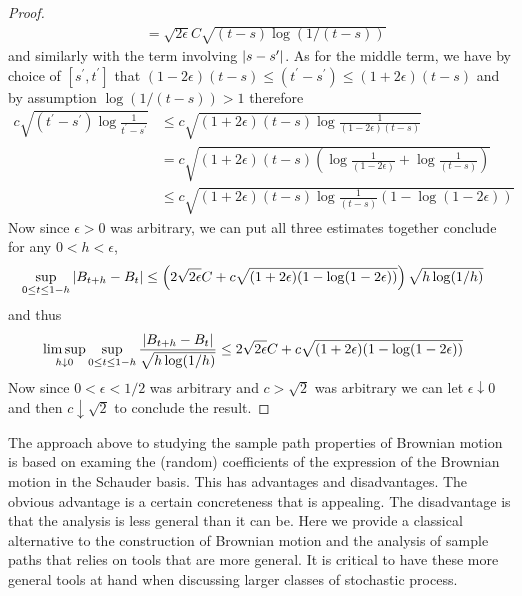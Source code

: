 \begin{proof}
\begin{align*}
&= \sqrt{2 \epsilon} C \sqrt{(t-s)\log(1/(t-s))}
\end{align*}
and similarly with the term involving $\left \vert s- s^\prime \right \vert$.  As for the
middle term, we have by choice of $[s^\prime, t^\prime]$ that $(1 -
2\epsilon)(t -s) \leq (t^\prime - s^\prime) \leq (1+2 \epsilon)(t-s)$
and by assumption $\log(1/(t-s)) > 1$ therefore
\begin{align*}
c \sqrt{(t^\prime - s^\prime)  \log\frac{1}{t^\prime -s^\prime}} &\leq c
\sqrt{(1 + 2\epsilon) (t - s)  \log\frac{1}{(1-2\epsilon) (t -s)}} \\
&= c\sqrt{(1 + 2\epsilon) (t - s)  (\log\frac{1}{(1-2\epsilon) }
+ \log\frac{1}{ (t -s)})} \\
&\leq c\sqrt{(1 + 2\epsilon) (t - s)  \log\frac{1}{ (t -s)} (1- \log(1-2\epsilon))} 
\end{align*}
Now since $\epsilon > 0$ was arbitrary, we can put all three estimates
together conclude for any $0 < h < \epsilon$, 
\begin{align*}
\sup_{0 \leq t \leq 1-h} \left \vert B_{t+h} - B_t \right \vert &\leq \left ( 2\sqrt{2\epsilon}C
  +  c\sqrt{(1 + 2\epsilon) (1- \log(1-2\epsilon)) } \right) \sqrt{h\log(1/h)}
\end{align*}
and thus 
\begin{align*}
\limsup_{h \downarrow 0} \sup_{0 \leq t \leq 1-h} \frac{\left \vert B_{t+h} - B_t \right \vert}{\sqrt{h\log(1/h)}} &\leq  2\sqrt{2\epsilon}C
  +  c\sqrt{(1 + 2\epsilon) (1- \log(1-2\epsilon))} 
\end{align*}
Now since $0 < \epsilon < 1/2$ was arbitrary and $c > \sqrt{2}$ was
arbitrary we can let $\epsilon \downarrow 0$ and then $c \downarrow
\sqrt{2}$ to conclude the result.
\end{proof}

The approach above to studying the sample path properties of Brownian
motion is based on examing the (random) coefficients of the expression
of the Brownian motion in the Schauder basis.  This has advantages and
disadvantages.  The obvious advantage is a certain concreteness that
is appealing.  The disadvantage is that the analysis is less general
than it can be.  Here we provide a classical alternative to the
construction of Brownian motion and the analysis of sample paths that
relies on tools that are more general.  It is critical to have these
more general tools at hand when discussing larger classes of
stochastic process.

